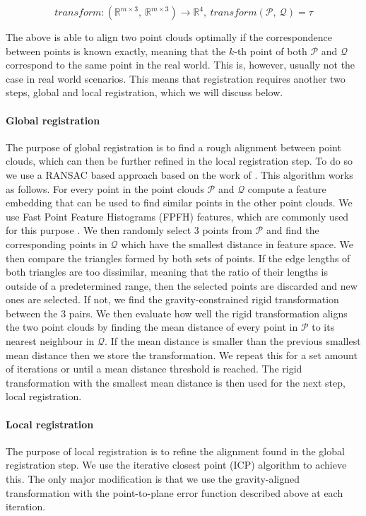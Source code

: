 \begin{equation}
    transform: (\mathbb{R}^{m \times 3},\ \mathbb{R}^{m \times 3}) \rightarrow \mathbb{R}^4,\ transform(\mathcal{P},\ \mathcal{Q}) = \tau
\end{equation}

The above is able to align two point clouds optimally if the correspondence between points is known exactly, meaning that the \(k\)-th point of both \(\mathcal{P}\) and \(\mathcal{Q}\) correspond to the same point in the real world. This is, however, usually not the case in real world scenarios. This means that registration requires another two steps, global and local registration, which we will discuss below.

\paragraph{Global registration}
The purpose of global registration is to find a rough alignment between point clouds, which can then be further refined in the local registration step. To do so we use a RANSAC based approach based on the work of \citet{koguciuk_parallel_2017}. This algorithm works as follows. For every point in the point clouds \(\mathcal{P}\) and \(\mathcal{Q}\) compute a feature embedding that can be used to find similar points in the other point clouds. We use Fast Point Feature Histograms (FPFH) features, which are commonly used for this purpose \citep{rusu_fast_2009}. We then randomly select 3 points from \(\mathcal{P}\) and find the corresponding points in \(\mathcal{Q}\) which have the smallest distance in feature space. We then compare the triangles formed by both sets of points. If the edge lengths of both triangles are too dissimilar, meaning that the ratio of their lengths is outside of a predetermined range, then the selected points are discarded and new ones are selected. If not, we find the gravity-constrained rigid transformation between the 3 pairs. We then evaluate how well the rigid transformation aligns the two point clouds by finding the mean distance of every point in \(\mathcal{P}\) to its nearest neighbour in \(\mathcal{Q}\). If the mean distance is smaller than the previous smallest mean distance then we store the transformation.
We repeat this for a set amount of iterations or until a mean distance threshold is reached. The rigid transformation with the smallest mean distance is then used for the next step, local registration.


\paragraph{Local registration}
The purpose of local registration is to refine the alignment found in the global registration step. We use the iterative closest point (ICP) algorithm to achieve this. The only major modification is that we use the gravity-aligned transformation with the point-to-plane error function described above at each iteration.


